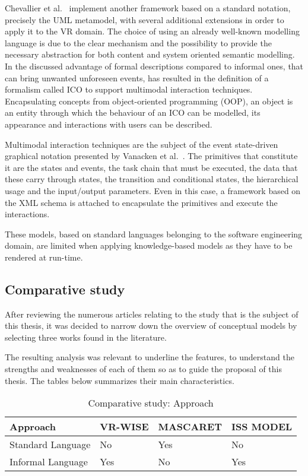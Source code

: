 Chevallier et al.~\cite{chevaillier_semantic_2012} implement another framework based on a standard notation, precisely the UML metamodel, with several additional extensions in order to apply it to the VR domain. The choice of using an already well-known modelling language is due to the clear mechanism and the possibility to provide the necessary abstraction for both content and system oriented semantic modelling. In \cite{costabile_formal_2005} the discussed advantage of formal descriptions compared to informal ones, that can bring unwanted unforeseen events, has resulted in the definition of a formalism called ICO to support multimodal interaction techniques. Encapsulating concepts from object-oriented programming (OOP), an object is an entity through which the behaviour of an ICO can be modelled, its appearance and interactions with users can be described.

Multimodal interaction techniques are the subject of the event state-driven graphical notation presented by Vanacken et al.~\cite{grapp06}. The primitives that constitute it are the states and events, the task chain that must be executed, the data that these carry through states, the transition and conditional states, the hierarchical usage and the input/output parameters.  Even in this case, a framework based on the XML schema is attached to encapsulate the primitives and execute the interactions.

These models, based on standard languages belonging to the software engineering domain, are limited when applying knowledge-based models as they have to be rendered at run-time.

\subsection{Comparative study}

After reviewing the numerous articles relating to the study that is the subject of this thesis, it was decided to narrow down the overview of conceptual models by selecting three works found in the literature.

The resulting analysis was relevant to underline the features, to understand the strengths and weaknesses of each of them so as to guide the proposal of this thesis. The tables below summarizes their main characteristics. 

\begin{table}
\begin{tabular}{|p{2.5cm}|p{3cm}|p{3cm}|p{3cm}|} 
\hline %
\textbf{Approach} 
& \textbf{VR-WISE} 
& \textbf{MASCARET}
& \textbf{ISS MODEL} \\ 
\hline
Standard Language
& No
& Yes
& No\\ 
\hline
Informal Language
& Yes
& No
& Yes\\ 
\hline
\end{tabular} 
\caption{Comparative study: Approach}
\label{table:Approach}
\end{table}

